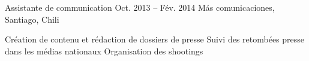 \begin{joblist}
{		%
	}



\item[Assistante de communication]{Oct. 2013 -- Fév. 2014 }     
  	{Más comunicaciones, Santiago, Chili}     
  	{

		\iftbftiny \vspace{-0.5cm} \fi
		\begin{itemize}
			  \iftbftiny \setlength\itemsep{-3pt} \fi
			  \cvitem[\checkmark]  Création de contenu et rédaction de dossiers de presse                                        
			  \cvitem[\checkmark]  Suivi des retombées presse dans les médias nationaux                                             
			  \cvitem[\checkmark]  Organisation des shootings

		\end{itemize}       
	}



   

\end{joblist}


%
%


